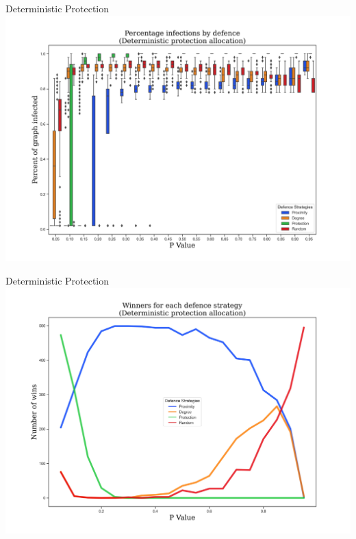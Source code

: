 \documentclass[unknownkeysallowed]{beamer}
\begin{document}

\begin{frame}{Deterministic Protection}
\centering\includegraphics[height=0.85\textheight]{assets/charts/percent_infected/Deterministic.jpg}
\end{frame}


\begin{frame}{Deterministic Protection}
\centering\includegraphics[height=0.8\textheight]{assets/charts/winners/Deterministic.jpg}
\end{frame}

\end{document}

